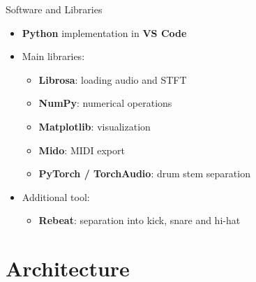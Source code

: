 \documentclass[aspectratio=169]{beamer}
\begin{document}
\begin{frame}{Software and Libraries}
    \begin{itemize}
        \item \textbf{Python} implementation in \textbf{VS Code}
        \item Main libraries:
        \begin{itemize}
            \item \textbf{Librosa}: loading audio and STFT
            \item \textbf{NumPy}: numerical operations
            \item \textbf{Matplotlib}: visualization
            \item \textbf{Mido}: MIDI export
            \item \textbf{PyTorch / TorchAudio}: drum stem separation
        \end{itemize}
        \item Additional tool:
        \begin{itemize}
            \item \textbf{Rebeat}: separation into kick, snare and hi-hat
        \end{itemize}
    \end{itemize}
\end{frame}

\section{Architecture}
\end{document}
